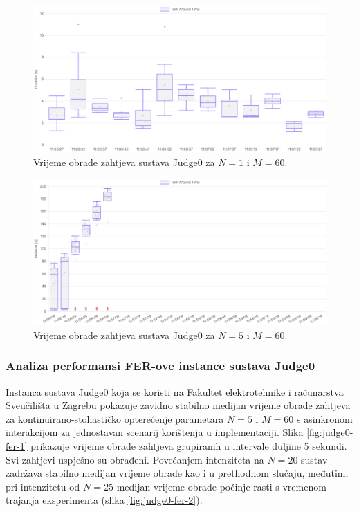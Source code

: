 \documentclass[times, utf8, diplomski]{fer}
\begin{document}
\begin{figure}[htb]
	\centering
	\includegraphics[width=\textwidth]{images/Judge0 TAT for 1 5s.png}
	\caption{
		Vrijeme obrade zahtjeva sustava Judge0 za $N=1$ i $M=60$.
	}
	\label{fig:judge0-1}
\end{figure}

\pagebreak

\begin{figure}[htb]
	\centering
	\includegraphics[width=\textwidth]{images/Judge0 TAT for 5 10s.png}
	\caption{
		Vrijeme obrade zahtjeva sustava Judge0 za $N=5$ i $M=60$.
	}
	\label{fig:judge0-2}
\end{figure}

\pagebreak

\subsubsection{Analiza performansi FER-ove instance sustava Judge0}

Instanca sustava Judge0 koja se koristi na Fakultet elektrotehnike i računarstva Sveučilišta u Zagrebu pokazuje zavidno stabilno medijan vrijeme obrade zahtjeva za kontinuirano-stohastičko opterećenje parametara $N=5$ i $M=60$ s asinkronom interakcijom za jednostavan scenarij korištenja u  implementaciji. Slika \ref{fig:judge0-fer-1} prikazuje vrijeme obrade zahtjeva grupiranih u intervale duljine 5 sekundi. Svi zahtjevi uspješno su obrađeni. Povećanjem intenziteta na $N=20$ sustav zadržava stabilno medijan vrijeme obrade kao i u prethodnom slučaju, međutim, pri intenzitetu od $N=25$ medijan vrijeme obrade počinje rasti s vremenom trajanja eksperimenta (slika \ref{fig:judge0-fer-2}).
\end{document}
